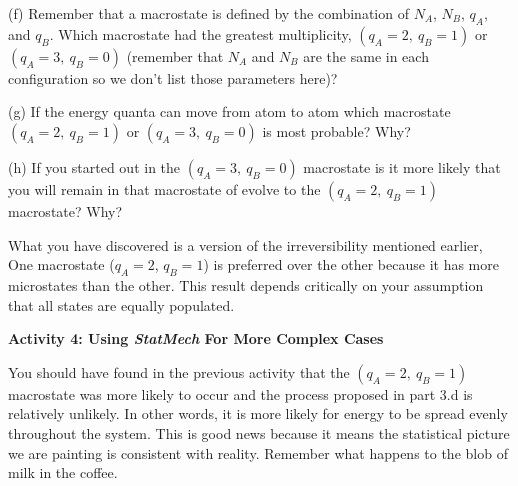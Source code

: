 (f) Remember that a macrostate is defined by the combination of $N_A$, $N_B$, $q_A$, and $q_B$.
Which macrostate had the greatest multiplicity, $(q_A=2, ~ q_B=1)$ or $(q_A=3, ~ q_B=0)$
(remember that $N_A$ and $N_B$ are the same in each configuration so we don't 
list those parameters here)?
\vspace{15mm}

(g) If the energy quanta can move from atom to atom
which macrostate $(q_A=2, ~ q_B=1)$ or $(q_A=3, ~ q_B=0)$ is most probable? Why?
\vspace{15mm}

(h) If you started out in the $(q_A=3, ~ q_B=0)$ macrostate is it more likely that you will remain
in that macrostate of evolve to the $(q_A=2, ~ q_B=1)$ macrostate? Why?
\vspace{15mm}

What you have discovered is a version of the irreversibility mentioned earlier,
One macrostate ($q_A=2$, $q_B=1$) is preferred over the other because it has more microstates
than the other.
This result depends critically on your assumption that all states are equally populated.

\newpage

\textbf{Activity 4: Using {\it StatMech} For More Complex Cases}

You should have found in the previous activity that the $(q_A=2, ~ q_B=1)$ 
macrostate was more likely
to occur and the process proposed in part 3.d is relatively unlikely.
In other words, it is more likely for energy to be spread evenly throughout the system.
This is good news because it means the statistical picture we are painting is consistent
with reality.
Remember what happens to the blob of milk in the coffee.

